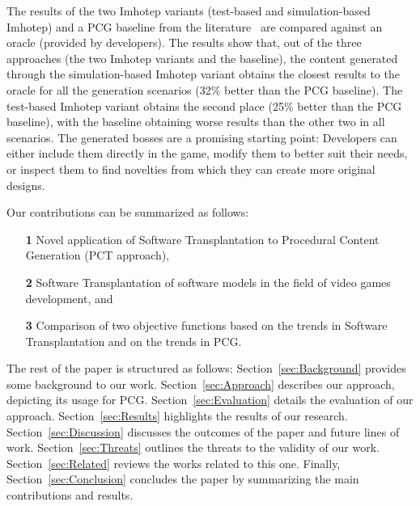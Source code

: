 The results of the two Imhotep variants (test-based and simulation-based Imhotep) and a PCG baseline from the literature~\cite{gallotta2022evolving} are compared against an oracle (provided by developers). The results show that, out of the three approaches (the two Imhotep variants and the baseline), the content generated through the simulation-based Imhotep variant obtains the closest results to the oracle for all the generation scenarios (32\% better than the PCG baseline). The test-based Imhotep variant obtains the second place (25\% better than the PCG baseline), with the baseline obtaining worse results than the other two in all scenarios. The generated bosses are a promising starting point: Developers can either include them directly in the game, modify them to better suit their needs, or inspect them to find novelties from which they can create more original designs.

Our contributions can be summarized as follows:
\begin{itemize}
    \item[\textbf{1}] Novel application of Software Transplantation to Procedural Content Generation (PCT approach),
    \item[\textbf{2}] Software Transplantation of software models in the field of video games development, and
    \item[\textbf{3}] Comparison of two objective functions based on the trends in Software Transplantation and on the trends in PCG.
\end{itemize}

The rest of the paper is structured as follows: Section~\ref{sec:Background} provides some background to   our work. Section~\ref{sec:Approach} describes our approach, depicting its usage for PCG. Section~\ref{sec:Evaluation} details the evaluation of our approach. Section~\ref{sec:Results} highlights the results of our research. Section~\ref{sec:Discussion} discusses the outcomes of the paper and future lines of work. Section~\ref{sec:Threats} outlines the threats to the validity of our work. Section~\ref{sec:Related} reviews the works related to this one. Finally, 
Section~\ref{sec:Conclusion} concludes the paper by summarizing the main contributions and results.